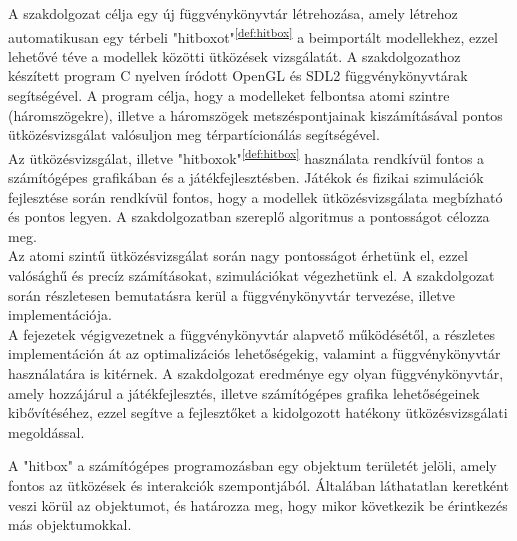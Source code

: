 
A szakdolgozat célja egy új függvénykönyvtár létrehozása, amely létrehoz automatikusan egy térbeli "hitboxot"\textsuperscript{\ref{def:hitbox}} a beimportált modellekhez, ezzel lehetővé téve a modellek közötti ütközések vizsgálatát. A szakdolgozathoz készített program \cite{C}{C} nyelven íródott \cite{OpenGL}{OpenGL} és \cite{SDL2}{SDL2} függvénykönyvtárak segítségével. A program célja, hogy a modelleket felbontsa atomi szintre (háromszögekre), illetve a háromszögek metszéspontjainak kiszámításával pontos ütközésvizsgálat valósuljon meg \cite{ter}{térpartícionálás} segítségével.\\

Az ütközésvizsgálat, illetve "hitboxok"\textsuperscript{\ref{def:hitbox}} használata rendkívül fontos a számítógépes grafikában és a játékfejlesztésben. Játékok és fizikai szimulációk fejlesztése során rendkívül fontos, hogy a modellek ütközésvizsgálata megbízható és pontos legyen. A szakdolgozatban szereplő algoritmus a pontosságot célozza meg.\\

Az atomi szintű ütközésvizsgálat során nagy pontosságot érhetünk el, ezzel valósághű és precíz számításokat, szimulációkat végezhetünk el. A szakdolgozat során részletesen bemutatásra kerül a függvénykönyvtár tervezése, illetve implementációja.\\

A fejezetek végigvezetnek a függvénykönyvtár alapvető működésétől, a részletes implementáción át az optimalizációs lehetőségekig, valamint a függvénykönyvtár használatára is kitérnek. A szakdolgozat eredménye egy olyan függvénykönyvtár, amely hozzájárul a játékfejlesztés, illetve számítógépes grafika lehetőségeinek kibővítéséhez, ezzel segítve a fejlesztőket a kidolgozott hatékony ütközésvizsgálati megoldással.
\vfill
\begin{definition}[Hitbox]
	A "hitbox" a számítógépes programozásban egy objektum területét jelöli, amely fontos az ütközések és interakciók szempontjából. Általában láthatatlan keretként veszi körül az objektumot, és határozza meg, hogy mikor következik be érintkezés más objektumokkal. 
	\label{def:hitbox}
\end{definition}